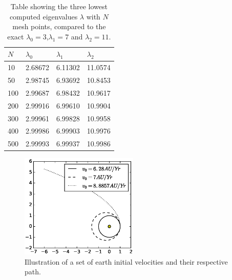 \documentclass[twoside,twocolumn]{article}
\begin{document}
	
	\begin{table}[h]
\caption{Table showing the three lowest computed eigenvalues $\lambda$ with $N$ mesh points, compared to the exact $\lambda_0=3$,$\lambda_1=7$ and $\lambda_2=11$.}\label{tbl:convergence}
		\centering
		\begin{tabular}{|l|l|l|l|}\hline
			$N$ & $\lambda_0$ & $\lambda_1$ & $\lambda_2$\\ \hline
			10 & 2.68672 & 6.11302 & 11.0574\\
			50 & 2.98745 & 6.93692 & 10.8453\\
			100& 2.99687 & 6.98432 & 10.9617\\
			200& 2.99916 & 6.99610 & 10.9904\\
			300& 2.99961 & 6.99828 & 10.9958\\
			400& 2.99986 & 6.99903 & 10.9976\\
			500& 2.99993 & 6.99937 & 10.9986\\\hline
\end{tabular}
\end{table}
\begin{figure}[p]
\includegraphics[width=0.5\textwidth]{figures/earthEsc.eps} 
		\caption{Illustration of a set of earth initial velocities and their respective path.}\label{fig:earth_vel}
\end{figure}
\end{document}
